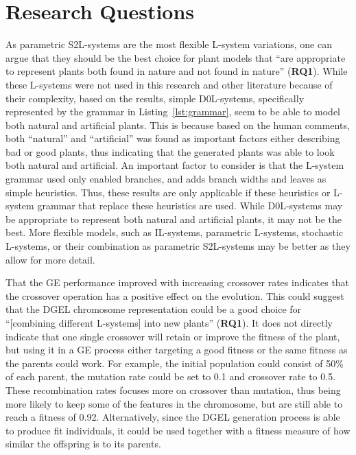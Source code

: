 \section{Research Questions}
As parametric S2L-systems are the most flexible \gls{L-system} variations, one can argue that they should be the best choice for plant models that ``are appropriate to represent plants both found in nature and not found in nature'' (\textbf{RQ1}).
While these \glspl{L-system} were not used in this research and other literature because of their complexity, based on the results, simple D0L-systems, specifically represented by the grammar in Listing~\ref{lst:grammar}, seem to be able to model both natural and artificial plants.
This is because based on the human comments, both ``natural'' and ``artificial'' was found as important factors either describing bad or good plants, thus indicating that the generated plants was able to look both natural and artificial.
An important factor to consider is that the \gls{L-system} grammar used only enabled branches, and adds branch widths and leaves as simple heuristics.
Thus, these results are only applicable if these heuristics or \gls{L-system} grammar that replace these heuristics are used.
While D0L-systems may be appropriate to represent both natural and artificial plants, it may not be the best.
More flexible models, such as IL-systems, parametric \glspl{L-system}, stochastic \glspl{L-system}, or their combination as parametric S2L-systems may be better as they allow for more detail.

That the \gls{GE} performance improved with increasing crossover rates indicates that the crossover operation has a positive effect on the evolution.
This could suggest that the \gls{DGEL} chromosome representation could be a good choice for ``[combining different \glspl{L-system}] into new plants'' (\textbf{RQ1}).
It does not directly indicate that one single crossover will retain or improve the fitness of the plant, but using it in a \gls{GE} process either targeting a good fitness or the same fitness as the parents could work.
For example, the initial population could consist of 50\% of each parent, the mutation rate could be set to 0.1 and crossover rate to 0.5.
These recombination rates focuses more on crossover than mutation, thus being more likely to keep some of the features in the chromosome, but are still able to reach a fitness of 0.92.
Alternatively, since the \gls{DGEL} generation process is able to produce fit individuals, it could be used together with a fitness measure of how similar the offspring is to its parents.

